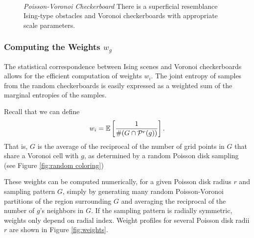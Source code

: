 \begin{figure}[h]
\centering
{}
\\
\caption{\emph{Poisson-Voronoi Checkerboard}\label{fig:Correspondence}
There is a superficial resemblance Ising-type obstacles 
and Voronoi checkerboards with appropriate scale parameters.
}
\end{figure}

\subsubsection{Computing the Weights $w_g$ \label{compute_weights}}
The statistical correspondence between Ising scenes and Voronoi checkerboards 
allows for the efficient computation of weights $w_i$.
The joint entropy of samples from the random checkerboards is
easily expressed as a weighted sum of the marginal entropies of the samples.

Recall that we can define
\begin{equation}
w_i = \mathbb{E}\left[\frac{1}{\#(G\cap\mathcal{P}^r(g))}\right].
\end{equation}
That is, $G$ is the average of the reciprocal of the number of grid points in $G$ that share a 
Voronoi cell with $g$, as determined by a random Poisson disk sampling (see Figure \ref{fig:random coloring})

These weights can be computed numerically, for a given Poisson disk radius $r$ and sampling pattern $G$,
simply by generating many random Poisson-Voronoi partitions of the region surrounding $G$
and averaging the reciprocal of the number of $g$'s neighbors in $G$.  
If the sampling pattern is radially symmetric, weights only depend on radial index.  Weight profiles for several
Poisson disk radii $r$ are shown in Figure \ref{fig:weights}.

